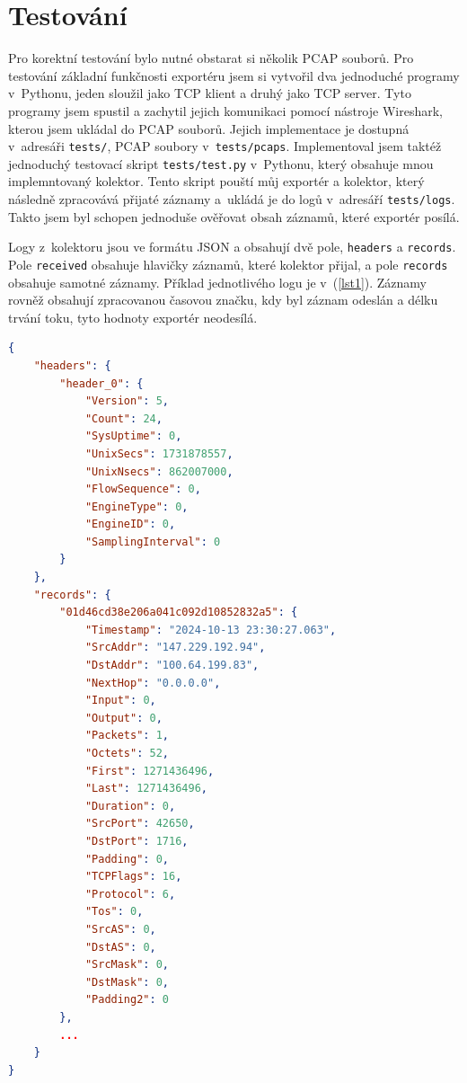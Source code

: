 \documentclass[a4paper, 11pt]{article}
\begin{document}
\begin{sloppypar}
\section{Testování}
Pro korektní testování bylo nutné obstarat si několik PCAP souborů. Pro testování základní funkčnosti exportéru jsem si vytvořil dva jednoduché programy v~Pythonu, jeden sloužil jako TCP klient a druhý jako TCP server. Tyto programy jsem spustil a zachytil jejich komunikaci pomocí nástroje Wireshark, kterou jsem ukládal do PCAP souborů. Jejich implementace je dostupná v~adresáři \texttt{tests/}, PCAP soubory v~\texttt{tests/pcaps}. Implementoval jsem taktéž jednoduchý testovací skript \texttt{tests/test.py} v~Pythonu, který obsahuje mnou implemntovaný kolektor. Tento skript pouští můj exportér a kolektor, který následně zpracovává přijaté záznamy a~ukládá je do logů v~adresáří \texttt{tests/logs}. Takto jsem byl schopen jednoduše ověřovat obsah záznamů, které exportér posílá.

Logy z~kolektoru jsou ve formátu JSON a obsahují dvě pole, \texttt{headers} a \texttt{records}. Pole \texttt{received} obsahuje hlavičky záznamů, které kolektor přijal, a pole \texttt{records} obsahuje samotné záznamy. Příklad jednotlivého logu je v~(\ref{lst1}). Záznamy rovněž obsahují zpracovanou časovou značku, kdy byl záznam odeslán a délku trvání toku, tyto hodnoty exportér neodesílá.

\begin{lstlisting}[language=json, caption={Ukázka logu z~kolektoru ze~souboru \texttt{tests/logs/myOyt\_test3.json}}, label={lst1}]
{
    "headers": {
        "header_0": {
            "Version": 5,
            "Count": 24,
            "SysUptime": 0,
            "UnixSecs": 1731878557,
            "UnixNsecs": 862007000,
            "FlowSequence": 0,
            "EngineType": 0,
            "EngineID": 0,
            "SamplingInterval": 0
        }
    },
    "records": {
        "01d46cd38e206a041c092d10852832a5": {
            "Timestamp": "2024-10-13 23:30:27.063",
            "SrcAddr": "147.229.192.94",
            "DstAddr": "100.64.199.83",
            "NextHop": "0.0.0.0",
            "Input": 0,
            "Output": 0,
            "Packets": 1,
            "Octets": 52,
            "First": 1271436496,
            "Last": 1271436496,
            "Duration": 0,
            "SrcPort": 42650,
            "DstPort": 1716,
            "Padding": 0,
            "TCPFlags": 16,
            "Protocol": 6,
            "Tos": 0,
            "SrcAS": 0,
            "DstAS": 0,
            "SrcMask": 0,
            "DstMask": 0,
            "Padding2": 0
        },
        ...
    }
}


\end{lstlisting}
\end{sloppypar}
\end{document}
